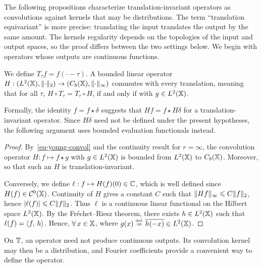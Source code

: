 The following propositions characterize translation-invariant operators as convolutions against kernels that may be distributions. The term ``translation equivariant'' is more precise: translating the input translates the output by the same amount.
%
The kernel\textquotesingle s regularity depends on the topologies of the input and output spaces, so the proof differs between the two settings below.
%
We begin with operators whose outputs are continuous functions.

\begin{prop}
	We define $T_\tau f = f(\cdot-\tau)$.
	A bounded linear operator $H : (L^2(\mathbb{X}),\lVert\cdot\rVert_2) \rightarrow (C_b(\mathbb{X}),\lVert\cdot\rVert_\infty)$ commutes with every translation, meaning that for all $\tau$, $H \circ T_\tau = T_\tau \circ H$, if and only if
	with $g \in L^2(\mathbb{X})$.
\end{prop}

Formally, the identity $f=f\star\delta$ suggests that $Hf=f\star H\delta$ for a translation-invariant operator. Since $H\delta$ need not be defined under the present hypotheses, the following argument uses bounded evaluation functionals instead.

\begin{proof}
	By~\eqref{eq-young-convol} and the continuity result for $r=\infty$, the convolution operator $H : f \mapsto f \star g$ with $g \in L^2(\mathbb{X})$ is bounded from $L^2(\mathbb{X})$ to $C_b(\mathbb{X})$. Moreover,
	so that such an $H$ is translation-invariant. 
	
	
	Conversely, we define $\ell : f \mapsto H(f)(0) \in \mathbb{C}$, which is well defined since $H(f) \in \mathcal{C}^0(\mathbb{X})$.
	Continuity of $H$ gives a constant $C$ such that $\lVert Hf\rVert_\infty \leqslant C \lVert f\rVert_2$, hence $|\ell(f)| \leqslant C \lVert f\rVert_2$. Thus $\ell$ is a continuous linear functional on the Hilbert space $L^2(\mathbb{X})$. By the Fr\'echet--Riesz theorem, there exists $h \in L^2(\mathbb{X})$ such that $\ell(f)=\langle f,\,h\rangle$.
	Hence, $\forall \, x \in \mathbb{X}$, 
	where $g(x)\stackrel{\mbox{\upshape\tiny def.}}{=}\overline{h(-x)}\in L^2(\mathbb{X})$.
\end{proof}

On $\mathbb{T}$, an operator need not produce continuous outputs. Its convolution kernel may then be a distribution, and Fourier coefficients provide a convenient way to define the operator.


